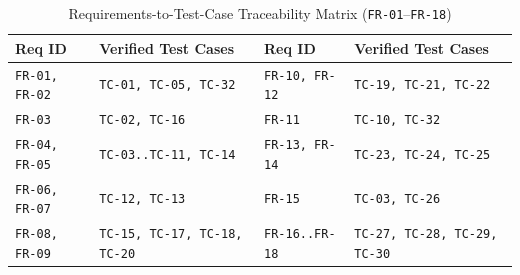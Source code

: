 \begin{table}[H]
  \centering
  \singlespacing\footnotesize
  \caption{Requirements-to-Test-Case Traceability Matrix (\texttt{FR-01}--\texttt{FR-18})}
  \label{tab:traceability}
  \renewcommand{\arraystretch}{1.22}
  \begin{tabularx}{\textwidth}{|L{2.5cm}|L{4.7cm}|L{2.5cm}|Y|}
    \hline
    \textbf{Req ID} & \textbf{Verified Test Cases} & \textbf{Req ID} & \textbf{Verified Test Cases} \\
    \hline
    \texttt{FR-01, FR-02} & \texttt{TC-01, TC-05, TC-32} & \texttt{FR-10, FR-12} & \texttt{TC-19, TC-21, TC-22} \\
    \hline
    \texttt{FR-03} & \texttt{TC-02, TC-16} & \texttt{FR-11} & \texttt{TC-10, TC-32} \\
    \hline
    \texttt{FR-04, FR-05} & \texttt{TC-03..TC-11, TC-14} & \texttt{FR-13, FR-14} & \texttt{TC-23, TC-24, TC-25} \\
    \hline
    \texttt{FR-06, FR-07} & \texttt{TC-12, TC-13} & \texttt{FR-15} & \texttt{TC-03, TC-26} \\
    \hline
    \texttt{FR-08, FR-09} & \texttt{TC-15, TC-17, TC-18, TC-20} & \texttt{FR-16..FR-18} & \texttt{TC-27, TC-28, TC-29, TC-30} \\
    \hline
  \end{tabularx}
\end{table}
